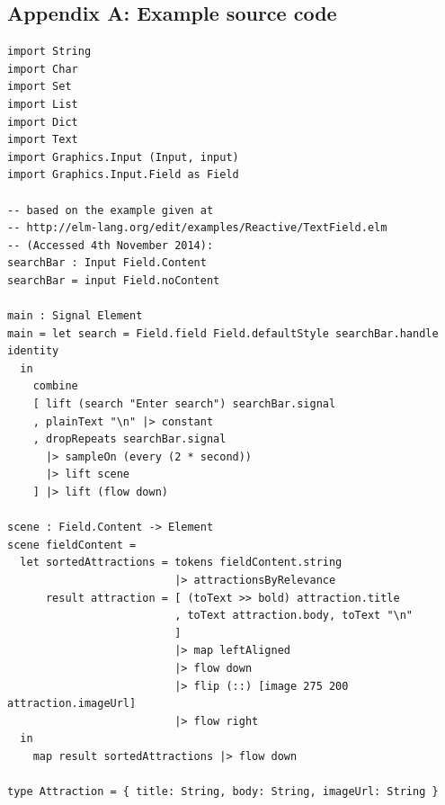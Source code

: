 \documentclass[12pt]{article}
\begin{document}
\begin{appendices}
\chapter{Appendix A: Example source code}
\label{app:A}
\begin{verbatim}
import String
import Char
import Set
import List
import Dict
import Text
import Graphics.Input (Input, input)
import Graphics.Input.Field as Field

-- based on the example given at 
-- http://elm-lang.org/edit/examples/Reactive/TextField.elm 
-- (Accessed 4th November 2014):
searchBar : Input Field.Content
searchBar = input Field.noContent

main : Signal Element
main = let search = Field.field Field.defaultStyle searchBar.handle identity
  in
    combine
    [ lift (search "Enter search") searchBar.signal
    , plainText "\n" |> constant
    , dropRepeats searchBar.signal 
      |> sampleOn (every (2 * second)) 
      |> lift scene
    ] |> lift (flow down)

scene : Field.Content -> Element
scene fieldContent = 
  let sortedAttractions = tokens fieldContent.string 
                          |> attractionsByRelevance
      result attraction = [ (toText >> bold) attraction.title
                          , toText attraction.body, toText "\n"
                          ] 
                          |> map leftAligned 
                          |> flow down
                          |> flip (::) [image 275 200 attraction.imageUrl]
                          |> flow right
  in 
    map result sortedAttractions |> flow down

type Attraction = { title: String, body: String, imageUrl: String }


\end{verbatim}
\end{appendices}
\end{document}
